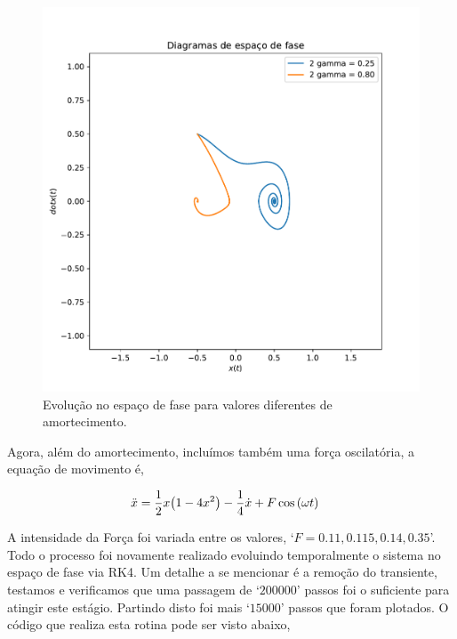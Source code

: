 \documentclass[twoside]{amsart}
\numberwithin{equation}{section}
\begin{document}
\begin{figure}[h]
    \includegraphics[width=0.5\linewidth]{II-1b.pdf}
    \caption{Evolução no espaço de fase para valores diferentes de amortecimento.}
    \label{fig2}
\end{figure}

Agora, além do amortecimento, incluímos também uma força oscilatória, 
a equação de movimento é,

\begin{align}
    \ddot x&=\frac12x\qty(1-4x^2)-\frac14\dot x+F\cos\qty(\omega t)\nonumber
\end{align}

A intensidade da Força foi variada entre os valores, `$F=0.11,0.115,0.14,0.35$'. 
Todo o processo foi novamente realizado evoluindo temporalmente o sistema no espaço 
de fase via RK4. Um detalhe a se mencionar é a remoção do transiente, 
testamos e verificamos que uma passagem de `$200000$' passos foi o suficiente para 
atingir este estágio. Partindo disto foi mais `$15000$' passos que foram 
plotados. O código que realiza esta rotina pode ser visto abaixo,
\end{document}
